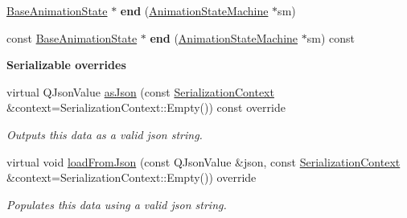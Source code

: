\begin{Indent}
\begin{DoxyCompactItemize}
\item 
\mbox{\label{classrev_1_1_state_connection_adaf7b82596ae2597b9001a4be9edbda6}} 
\mbox{\hyperlink{classrev_1_1_base_animation_state}{Base\+Animation\+State}} $\ast$ {\bfseries end} (\mbox{\hyperlink{classrev_1_1_animation_state_machine}{Animation\+State\+Machine}} $\ast$sm)
\item 
\mbox{\label{classrev_1_1_state_connection_a111e9a5f922d53e9135daf737add220f}} 
const \mbox{\hyperlink{classrev_1_1_base_animation_state}{Base\+Animation\+State}} $\ast$ {\bfseries end} (\mbox{\hyperlink{classrev_1_1_animation_state_machine}{Animation\+State\+Machine}} $\ast$sm) const
\end{DoxyCompactItemize}
\end{Indent}
\begin{Indent}\textbf{ Serializable overrides}\par
\begin{DoxyCompactItemize}
\item 
\mbox{\label{classrev_1_1_state_connection_a43187be7c2ac626b24d9e73ad143fd11}} 
virtual Q\+Json\+Value \mbox{\hyperlink{classrev_1_1_state_connection_a43187be7c2ac626b24d9e73ad143fd11}{as\+Json}} (const \mbox{\hyperlink{structrev_1_1_serialization_context}{Serialization\+Context}} \&context=Serialization\+Context\+::\+Empty()) const override
\begin{DoxyCompactList}\small\item\em Outputs this data as a valid json string. \end{DoxyCompactList}\item 
\mbox{\label{classrev_1_1_state_connection_ada1cf9656afa9b1f8e00602023e76945}} 
virtual void \mbox{\hyperlink{classrev_1_1_state_connection_ada1cf9656afa9b1f8e00602023e76945}{load\+From\+Json}} (const Q\+Json\+Value \&json, const \mbox{\hyperlink{structrev_1_1_serialization_context}{Serialization\+Context}} \&context=Serialization\+Context\+::\+Empty()) override
\begin{DoxyCompactList}\small\item\em Populates this data using a valid json string. \end{DoxyCompactList}\end{DoxyCompactItemize}
\end{Indent}
